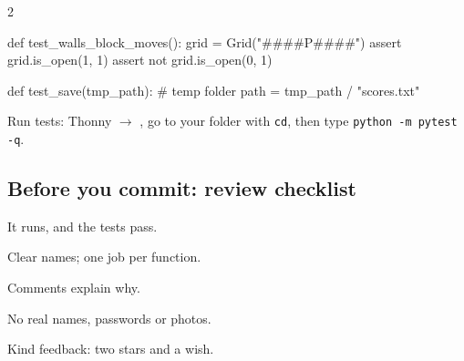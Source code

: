 \documentclass[level=3]{kidscode}
\begin{document}
\begin{multicols}{2}
\begin{sheetcode}
def test_walls_block_moves():
    grid = Grid("###\n#P#\n###")
    assert grid.is_open(1, 1)
    assert not grid.is_open(0, 1)

def test_save(tmp_path):  # temp folder
    path = tmp_path / "scores.txt"
\end{sheetcode}
Run tests: Thonny  $\rightarrow$ , go to your folder with
\texttt{cd}, then type \texttt{python -m pytest -q}.

\subsection{Before you commit: review checklist}
\begin{checklist}
  \item It runs, and the tests pass.
  \item Clear names; one job per function.
  \item Comments explain why.
  \item No real names, passwords or photos.
  \item Kind feedback: two stars and a wish.
\end{checklist}

\end{multicols}
\end{document}
